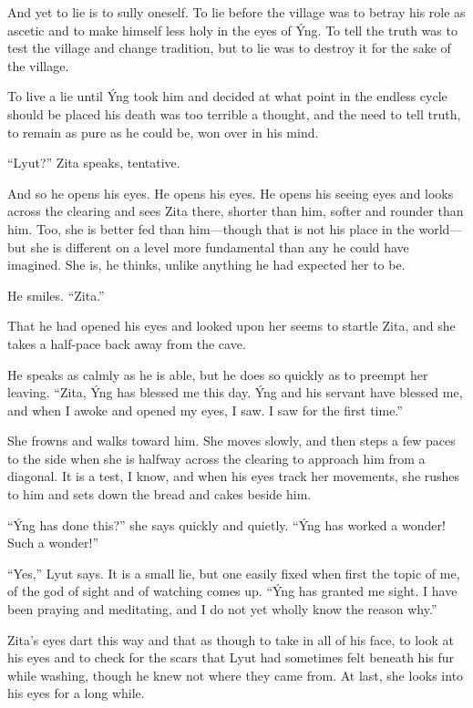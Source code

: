 And yet to lie is to sully oneself. To lie before the village was to betray his role as ascetic and to make himself less holy in the eyes of Ýng. To tell the truth was to test the village and change tradition, but to lie was to destroy it for the sake of the village.

To live a lie until Ýng took him and decided at what point in the endless cycle should be placed his death was too terrible a thought, and the need to tell truth, to remain as pure as he could be, won over in his mind.

``Lyut?'' Zita speaks, tentative.

And so he opens his eyes. He opens his eyes. He opens his seeing eyes and looks across the clearing and sees Zita there, shorter than him, softer and rounder than him. Too, she is better fed than him---though that is not his place in the world---but she is different on a level more fundamental than any he could have imagined. She is, he thinks, unlike anything he had expected her to be.

He smiles. ``Zita.''

That he had opened his eyes and looked upon her seems to startle Zita, and she takes a half-pace back away from the cave.

He speaks as calmly as he is able, but he does so quickly as to preempt her leaving. ``Zita, Ýng has blessed me this day. Ýng and his servant have blessed me, and when I awoke and opened my eyes, I saw. I saw for the first time.''

She frowns and walks toward him. She moves slowly, and then steps a few paces to the side when she is halfway across the clearing to approach him from a diagonal. It is a test, I know, and when his eyes track her movements, she rushes to him and sets down the bread and cakes beside him.

``Ýng has done this?'' she says quickly and quietly. ``Ýng has worked a wonder! Such a wonder!''

``Yes,'' Lyut says. It is a small lie, but one easily fixed when first the topic of me, of the god of sight and of watching comes up. ``Ýng has granted me sight. I have been praying and meditating, and I do not yet wholly know the reason why.''

Zita's eyes dart this way and that as though to take in all of his face, to look at his eyes and to check for the scars that Lyut had sometimes felt beneath his fur while washing, though he knew not where they came from. At last, she looks into his eyes for a long while.

